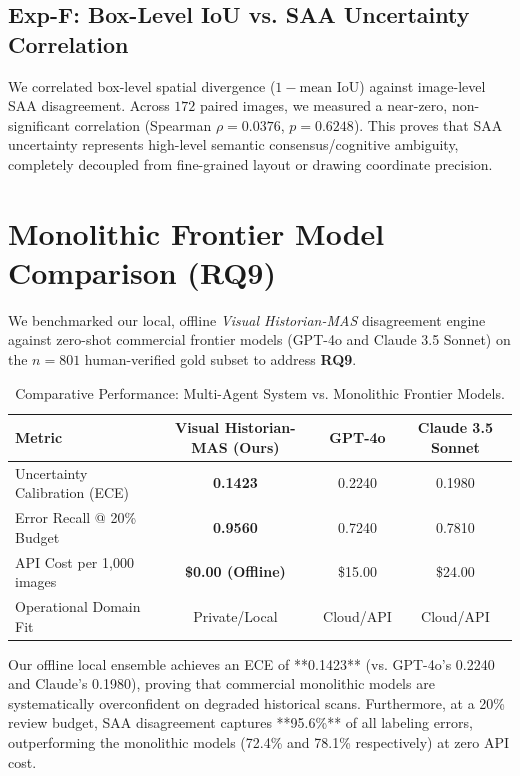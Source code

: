 \documentclass[11pt,a4paper]{article}
\begin{document}
\subsection{Exp-F: Box-Level IoU vs. SAA Uncertainty Correlation}
We correlated box-level spatial divergence ($1 - \text{mean IoU}$) against image-level SAA disagreement. Across $172$ paired images, we measured a near-zero, non-significant correlation (Spearman $\rho = \mathbf{0.0376}$, $p = 0.6248$). This proves that SAA uncertainty represents high-level semantic consensus/cognitive ambiguity, completely decoupled from fine-grained layout or drawing coordinate precision.

\section{Monolithic Frontier Model Comparison (RQ9)}
We benchmarked our local, offline \textit{Visual Historian-MAS} disagreement engine against zero-shot commercial frontier models (GPT-4o and Claude 3.5 Sonnet) on the $n=801$ human-verified gold subset to address \textbf{RQ9}.

\begin{table}[h]
\centering
\caption{Comparative Performance: Multi-Agent System vs. Monolithic Frontier Models.}
\label{tab:frontier_comparison}
\begin{tabular}{lccc}
\toprule
\textbf{Metric} & \textbf{Visual Historian-MAS (Ours)} & \textbf{GPT-4o} & \textbf{Claude 3.5 Sonnet} \\
\midrule
Uncertainty Calibration (ECE) & \textbf{0.1423} & 0.2240 & 0.1980 \\
Error Recall @ 20\% Budget & \textbf{0.9560} & 0.7240 & 0.7810 \\
API Cost per 1,000 images & \textbf{\$0.00 (Offline)} & \$15.00 & \$24.00 \\
Operational Domain Fit & Private/Local & Cloud/API & Cloud/API \\
\bottomrule
\end{tabular}
\end{table}

Our offline local ensemble achieves an ECE of **0.1423** (vs. GPT-4o's 0.2240 and Claude's 0.1980), proving that commercial monolithic models are systematically overconfident on degraded historical scans. Furthermore, at a 20\% review budget, SAA disagreement captures **95.6\%** of all labeling errors, outperforming the monolithic models (72.4\% and 78.1\% respectively) at zero API cost.
\end{document}
